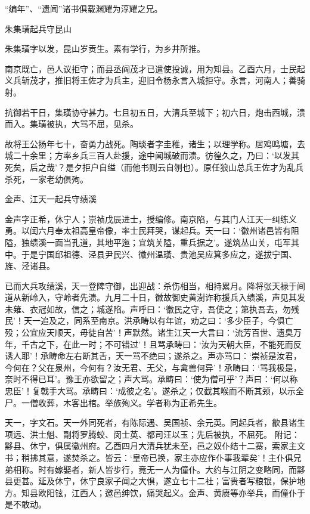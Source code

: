 \documentclass[]{article}
\begin{document}
``编年''、``遗闻''诸书俱载渊耀为淳耀之兄。

朱集璜起兵守昆山

朱集璜字以发，昆山岁贡生。素有学行，为乡井所推。

南京既亡，邑人议拒守；而县丞阎茂才已遣使投诚，用为知县。乙酉六月，士民起义兵斩茂才，推旧将王佐才为兵主，迎旧令杨永言入城拒守。永言，河南人；善骑射。

抗御若干日，集璜协守甚力。七且初五日，大清兵至城下；初六日，炮击西城，溃而入。集璜被执，大骂不屈，见杀。

故将王公扬年七十，奋勇力战死。陶琰者字圭稚，诸生；以理学称。居鸡鸣塘，去城二十余里；方率乡兵三百人赴援，途中闻城破而溃。彷徨久之，乃曰：`以发其死矣，后之哉'？是夕拒户自缢（而他书则云自刎也）。原任狼山总兵王佐才为乱兵杀死，一家老幼俱殉。

金声、江天一起兵守绩溪

金声字正希，休宁人；崇祯戊辰进士，授编修。南京陷，与其门人江天一纠练义勇。以闰六月奉太祖高皇帝像，率士民拜哭，谋起兵。天一曰：`徽州诸邑皆有阻隘，独绩溪一面当孔道，其地平迤；宜筑关隘，重兵据之'。遂筑丛山关，屯军其中。于是宁国邱祖德、泾县尹民兴、徽州温璜、贵池吴应箕多应之，遂拔宁国、旌、泾诸县。

已而大兵攻绩溪，天一登陴守御，出迎战：杀伤相当，相持累月。降将张天禄于间道从新岭入，守岭者先溃。九月二十日，徽故御史黄澍诈称援兵入绩溪，声见其发未薙、衣冠如故，信之；城遂陷。声呼曰：`徽民之守，吾使之；第执吾去，勿残民'！天一追及之，同系至南京。洪承畴以有年谊，劝之曰：`多少臣子，今俱亡殁；公宜应天顺天，毋徒自苦'！声默然。诸生江天一大言曰：`流芳百世、遗臭万年，千古之下，在此一时；不可错过'！且骂承畴曰：`汝为天朝大臣，不能死而反诱人耶'！承畴命左右断其舌，天一骂不绝曰；遂杀之。声亦骂口：`崇祯是汝君，今何在？父在泉州，今何有？汝无君、无父，与禽兽何异'！承畴曰：`骂我极是，奈时不得已耳'。豫王亦欲留之；声大骂。承畴曰：`使为僧可乎'？声曰：`何以称忠臣'！复戟手大骂。承畴曰：`成彼之名'。遂杀之；仅截其喉而不断其颈，以示全尸。一僧收葬，木客出棺。举族殉义。学者称为正希先生。

天一，字文石。天一外同死者，有陈际遇、吴国祯、余元英。同起兵者，歙县诸生项远、洪士魁、副将罗腾蛟、闵士英、都司汪以玉；先后被执，不屈死。
附记：黟县、休宁，俱属徽州府。乙酉四月大清兵犹未至，邑之奴仆结十二寨，索家主文书；稍拂其意，遂焚杀之。皆云：`皇帝已换，家主亦应作仆事我辈矣'！主仆俱兄弟相称。时有嫁娶者，新人皆步行，竟无一人为僮仆。大约与江阴之变略同，而黟县更甚。延及休宁，休宁良家子闻之大惧，遂立七十二社；富贵者写粮银，保护地方。知县欧阳铉，江西人；邀邑绅饮，痛哭起义。金声、黄赓等亦举兵，而僮仆于是不敢动。
\end{document}
